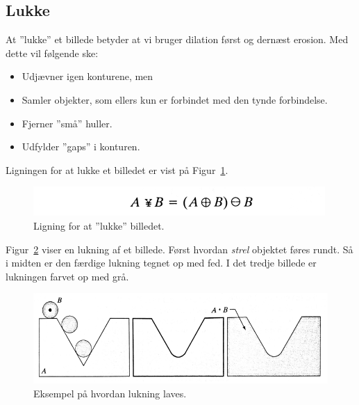 \subsection{Lukke}

At ''lukke'' et billede betyder at vi bruger dilation først og dernæst erosion. Med dette vil følgende ske:

\begin{itemize}
	\item Udjævner igen konturene, men
	\item Samler objekter, som ellers kun er forbindet med den tynde forbindelse.
	\item Fjerner ''små'' huller.
	\item Udfylder ''gaps'' i konturen.
\end{itemize}

Ligningen for at lukke et billedet er vist på Figur~\ref{fig:closingeq}.

\begin{figure}[H]
	\centering
	\includegraphics[width=0.6\linewidth]{figs/spm09/closingeq}
	\caption{Ligning for at ''lukke'' billedet.}
	\label{fig:closingeq}
\end{figure}

Figur~\ref{fig:closing-shape} viser en lukning af et billede. Først hvordan \textit{strel} objektet føres rundt. Så i midten er den færdige lukning tegnet op med fed. I det tredje billede er lukningen farvet op med grå.

\begin{figure}[H]
	\centering
	\includegraphics[width=0.9\linewidth]{figs/spm09/closing-shape}
	\caption{Eksempel på hvordan lukning laves.}
	\label{fig:closing-shape}
\end{figure}
